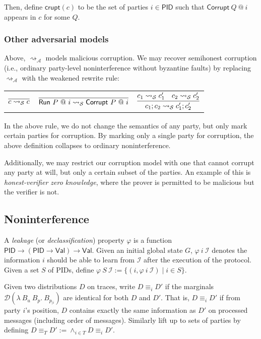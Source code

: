 \documentclass{article}
\newcommand{\Val}{\mathsf{Val}}
\newcommand{\PID}{\mathsf{PID}}
\newcommand{\I}{\mathcal{I}}
\begin{document}
Then, define $\mathsf{crupt}(c)$ to be the set of parties $i \in \PID$ such that $\textsf{Corrupt}\ Q\ @\ i$ appears in $c$ for some $Q$.

\subsubsection{Other adversarial models}

Above, $\rightsquigarrow_\mathcal{A}$ models malicious corruption. We may recover semihonest corruption (i.e., ordinary party-level noninterference without byzantine faults) by replacing $\rightsquigarrow_\mathcal{A}$ with the weakened rewrite rule:

\begin{tabular}{ccc}
    $\infer{c \rightsquigarrow_{\mathcal{S}} c}{}$ & 
    $\infer{\textsf{Run}\ P\ @\ i \rightsquigarrow_{\mathcal{S}} \textsf{Corrupt}\ P\ @\ i}{}$ &
    $\infer{c_1;c_2 \rightsquigarrow_{\mathcal{S}} c_1'; c_2'} {c_1 \rightsquigarrow_\mathcal{S} c_1' & c_2 \rightsquigarrow_\mathcal{S} c_2'}$ \\
\end{tabular}

In the above rule, we do not change the semantics of any party, but only mark certain parties for corruption. By marking only a single party for corruption, the above definition collapses to ordinary noninterference.

Additionally, we may restrict our corruption model with one that cannot corrupt any party at will, but only a certain subset of the parties. An example of this is \emph{honest-verifier zero knowledge}, where the prover is permitted to be malicious but the verifier is not.

\subsection{Noninterference}

A \emph{leakage} (or \emph{declassification}) property $\varphi$ is a function $\PID \to (\PID \to \Val) \to \Val$. Given an initial global state $G$, $\varphi\ i\ \I$ denotes the information $i$ should be able to learn from $\I$ after the execution of the protocol. Given a set $S$ of PIDs, define $\varphi\ S\ \I := \{(i, \varphi\ i\ \I) \mid i \in S\}$.

Given two distributions $D$ on traces, write $D \equiv_i D'$ if the marginals $\mathcal{D} (\lambda\ B_u\ B_p.\ B_{p_{| i}})$ are identical for both $D$ and $D'$. That is, $D \equiv_i D'$ if from party $i$'s position, $D$ contains exactly the same information as $D'$ on processed messages (including order of messages). Similarly lift up to sets of parties by defining $D \equiv_T D' := \wedge_{i \in T} D \equiv_i D'$.
\end{document}
